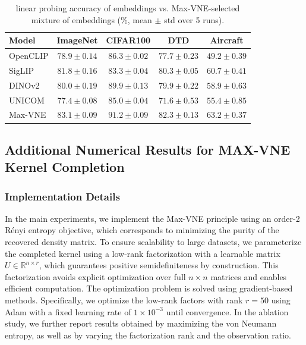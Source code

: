 \documentclass{article}
\theoremstyle{plain}
\theoremstyle{definition}
\begin{document}
\begin{appendices}
\begin{table}[h]
\caption{linear probing accuracy of embeddings vs. Max-VNE-selected mixture of embeddings (\%, mean $\pm$ std over 5 runs).}
\label{tab:lp_std_linear_kernel}
\centering
\begin{tabular}{lcccc}
\toprule
\textbf{Model} & \textbf{ImageNet} & \textbf{CIFAR100}& \textbf{DTD} & \textbf{Aircraft} \\
\midrule
OpenCLIP    &  $78.9 \pm 0.14$  & $86.3 \pm 0.02$ &  $77.7 \pm 0.23$ & $49.2 \pm 0.39$\\
SigLIP      &  $81.8 \pm 0.16$  & $83.3 \pm 0.04$ &  $80.3 \pm0.05$ &  $60.7 \pm 0.41$ \\
DINOv2      &  $80.0 \pm 0.19$  & $89.9 \pm 0.13$ &  $79.9 \pm0.22$ &  $58.9 \pm 0.63 $\\
UNICOM      &  $77.4 \pm 0.08$  & $85.0 \pm0.04 $ &  $71.6 \pm 0.53$ &  $55.4 \pm 0.85$\\
\midrule
Max-VNE     &  $83.1 \pm 0.09$  & $91.2 \pm 0.09$ &  $82.3 \pm 0.13$  & $63.2 \pm 0.37$ \\
\bottomrule
\end{tabular}
\end{table}











\subsection{Additional Numerical Results for MAX-VNE  Kernel Completion}

\subsubsection{Implementation Details}
In the main experiments, we implement the Max-VNE principle using an order-2 R\'enyi entropy objective, which corresponds to minimizing the purity of the recovered density matrix.
To ensure scalability to large datasets, we parameterize the completed kernel using a low-rank factorization with a learnable matrix $U \in \mathbb{R}^{n \times r}$, which guarantees positive semidefiniteness by construction.
This factorization avoids explicit optimization over full $n \times n$ matrices and enables efficient computation.
The optimization problem is solved using gradient-based methods.
Specifically, we optimize the low-rank factors with rank $r=50$ using Adam with a fixed learning rate of $1\times10^{-3}$ until convergence.
In the ablation study, we further report results obtained by maximizing the von Neumann entropy, as well as by varying the factorization rank and the observation ratio.


\end{appendices}
\end{document}
